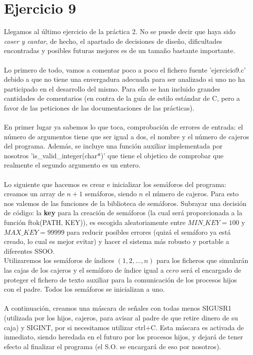 \documentclass[12pt]{article}
\begin{document}
\section{Ejercicio 9}
Llegamos al último ejercicio de la práctica 2. No se puede decir que haya sido \emph{coser y cantar}, de hecho, el apartado de decisiones de diseño, dificultades encontradas y posibles futuras mejores es de un tamaño bastante importante.\\\\
Lo primero de todo, vamos a comentar poco a poco el fichero fuente 'ejercicio9.c' debido a que no tiene una envergadura adecuada para ser analizado si uno no ha participado en el desarrollo del mismo. Para ello se han incluido grandes cantidades de comentarios (en contra de la guía de estilo estándar de C, pero a favor de las peticiones de las documentaciones de las prácticas).\\\\
En primer lugar ya sabemos lo que toca, comprobación de errores de entrada: el número de argumentos tiene que ser igual a dos, el nombre y el número de cajeros del programa. Además, se incluye una función auxiliar implementada por nosotros 'is\_valid\_integer(char*)' que tiene el objetico de comprobar que realmente el segundo argumento es un entero.\\\\
Lo siguiente que hacemos es crear e inicializar los semáforos del programa: creamos  un array de $n+1$ semáforos, siendo $n$ el número de cajeros. Para esto nos valemos de las funciones de la biblioteca de semáforos. Subrayar una decisión de código: la \textbf{key} para la creación de semáforos (la cual será proporcionada a la función ftok(PATH, KEY)), es escogida aleatoriamente entre $MIN\_KEY=100$ y $MAX\_KEY=99999$ para reducir posibles errores (quizá el semáforo ya está creado, lo cual es mejor evitar) y hacer el sistema más robusto y portable a diferentes SSOO.\\ Utilizaremos los semáforos de índices $(1, 2, ..., n)$ para los ficheros que simularán las cajas de los cajeros y el semáforo de índice igual a $cero$ será el encargado de proteger el fichero de texto auxiliar para la comunicación de los procesos hijos con el padre. Todos los semáforos se inicializan a uno.\\\\
A continuación, creamos una máscara de señales con todas menos SIGUSR1 (utilizada por los hijos, cajeros, para avisar al padre de que retire dinero de su caja) y SIGINT, por si necesitamos utilizar ctrl+C. Esta máscara es activada de inmediato, siendo heredada en el futuro por los procesos hijos, y dejará de tener efecto al finalizar el programa (el S.O. se encargará de eso por nosotros).\\\\
\end{document}
